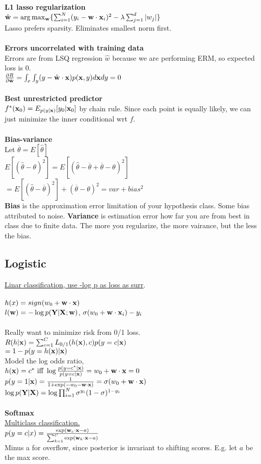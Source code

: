 \textbf{L1 lasso regularization}\\
$\hat{{\textrm{\textbf{w}}}} = \arg\max_{{\textrm{\textbf{w}}}}\{\sum_{i=1}^{N}(y_i - {\textrm{\textbf{w}}}\cdot{\textrm{\textbf{x}}}_i)^2 - \lambda\sum_{j=1}^{d}|w_j|\}$\\
Lasso prefers sparsity. Eliminates smallest norm first.\\\\
\textbf{Errors uncorrelated with training data}\\
Errors are from LSQ regression $\hat{w}$ because we are performing ERM, so expected loss is 0.\\
$\frac{\partial R}{\partial \hat{{\textrm{\textbf{w}}}}} = \int_x\int_y (y-\hat{{\textrm{\textbf{w}}}}\cdot {\textrm{\textbf{x}}})p({\textrm{\textbf{x}}},y)d{\textrm{\textbf{x}}} dy = 0$\\\\
\textbf{Best unrestricted predictor}\\
$f^{*}({\textrm{\textbf{x}}}_0) = E_{p(y|{\textrm{\textbf{x}}})}[y_0|{\textrm{\textbf{x}}}_0]$ by chain rule. Since each point is equally likely, we can just minimize the inner conditional wrt $f$.\\\\
\textbf{Bias-variance}\\
Let $\overline{\theta} = E[\hat{\theta}]$\\
$E[(\hat{\theta} - \theta)^2] = E[(\hat{\theta} - \overline{\theta} + \overline{\theta} - \theta)^2]$\\
$= E[(\hat{\theta} - \overline{\theta})^2] + (\overline{\theta} - \theta)^2 = var + bias^2$\\
\textbf{Bias} is the approximation error limitation of your hypothesis class. Some bias attributed to noise. \textbf{Variance} is estimation error how far you are from best in class due to finite data. The more you regularize, the more vairance, but the less the bias.
\subsection{Logistic}
\underline{Linar 
classification, use -log p as loss as surr}.\\\\
$h(x) = sign(w_0 + {\textrm{\textbf{w}}}\cdot {\textrm{\textbf{x}}})$\\
$l({\textrm{\textbf{w}}}) = -\log p(\textbf{Y}|{\textrm{\textbf{X}}}; {\textrm{\textbf{w}}})$, $\sigma(w_0 + {\textrm{\textbf{w}}}\cdot {\textrm{\textbf{x}}}_i) - y_i$\\\\
Really want to minimize risk from 0/1 loss.\\
$R(h|{\textrm{\textbf{x}}}) = \sum_{c=1}^{C}L_{0/1}(h({\textrm{\textbf{x}}}),c)p(y=c|{\textrm{\textbf{x}}})$\\
$= 1-p(y=h({\textrm{\textbf{x}}})|{\textrm{\textbf{x}}})$\\
Model the log odds ratio,\\
$h({\textrm{\textbf{x}}}) = c^* \textrm{ iff } \log \frac{p(y=c^*|{\textrm{\textbf{x}}})}{p(y=c|{\textrm{\textbf{x}}})} = w_0 + {\textrm{\textbf{w}}}\cdot {\textrm{\textbf{x}}} = 0$\\
$p(y=1|{\textrm{\textbf{x}}}) = \frac{1}{1+\exp(-w_0 - {\textrm{\textbf{w}}}\cdot {\textrm{\textbf{x}}})} = \sigma(w_0 + {\textrm{\textbf{w}}}\cdot {\textrm{\textbf{x}}})$\\
$\log p(\textbf{Y}|{\textrm{\textbf{X}}}) = \log \prod_{i=1}^{N} \sigma^{y_i}(1-\sigma)^{1-y_i}$\\\\
\textbf{Softmax}\\
\underline{Multiclass classification.}\\
$p(y=c|x) = \frac{\exp({\textrm{\textbf{w}}}_c\cdot {\textrm{\textbf{x}}} - a)}{\sum_{k=1}^{C}\exp({\textrm{\textbf{w}}}_k\cdot {\textrm{\textbf{x}}} - a)}$\\
Minus a for overflow, since posterior is invariant to shifting scores. E.g. let $a$ be the max score.
